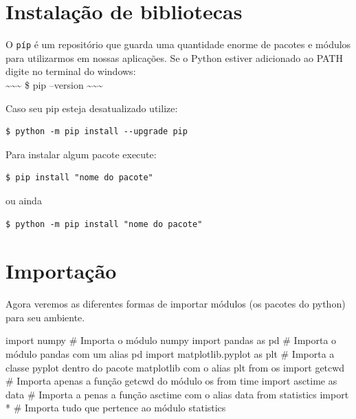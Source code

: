 \documentclass[
  letterpaper,
  DIV=11,
  numbers=noendperiod]{scrreprt}
\newenvironment{Shaded}{\begin{snugshade}}{\end{snugshade}}
\newcommand{\CommentTok}[1]{\textcolor[rgb]{0.37,0.37,0.37}{#1}}
\newcommand{\ImportTok}[1]{\textcolor[rgb]{0.00,0.46,0.62}{#1}}
\newcommand{\NormalTok}[1]{\textcolor[rgb]{0.00,0.23,0.31}{#1}}
\newcommand{\OperatorTok}[1]{\textcolor[rgb]{0.37,0.37,0.37}{#1}}
\begin{document}

\hypertarget{instalauxe7uxe3o-de-bibliotecas}{%
\chapter{Instalação de
bibliotecas}\label{instalauxe7uxe3o-de-bibliotecas}}

O \texttt{píp} é um repositório que guarda uma quantidade enorme de
pacotes e módulos para utilizarmos em nossas aplicações. Se o Python
estiver adicionado ao PATH digite no terminal do windows:\\
\textasciitilde\textasciitilde\textasciitilde{} \$ pip --version
\textasciitilde\textasciitilde\textasciitilde{}

Caso seu pip esteja desatualizado utilize:

\begin{verbatim}
$ python -m pip install --upgrade pip
\end{verbatim}

Para instalar algum pacote execute:

\begin{verbatim}
$ pip install "nome do pacote"
\end{verbatim}

ou ainda

\begin{verbatim}
$ python -m pip install "nome do pacote"
\end{verbatim}


\hypertarget{importauxe7uxe3o}{%
\chapter{Importação}\label{importauxe7uxe3o}}

Agora veremos as diferentes formas de importar módulos (os pacotes do
python) para seu ambiente.

\begin{Shaded}
\begin{Highlighting}[]
\ImportTok{import}\NormalTok{ numpy                        }\CommentTok{\# Importa o módulo numpy}
\ImportTok{import}\NormalTok{ pandas }\ImportTok{as}\NormalTok{ pd                 }\CommentTok{\# Importa o módulo pandas com um alias pd}
\ImportTok{import}\NormalTok{ matplotlib.pyplot }\ImportTok{as}\NormalTok{ plt     }\CommentTok{\# Importa a classe pyplot dentro do pacote matplotlib com o alias plt}
\ImportTok{from}\NormalTok{ os }\ImportTok{import}\NormalTok{ getcwd               }\CommentTok{\# Importa apenas a função getcwd do módulo os}
\ImportTok{from}\NormalTok{ time }\ImportTok{import}\NormalTok{ asctime }\ImportTok{as}\NormalTok{ data    }\CommentTok{\# Importa a penas a função asctime com o alias data }
\ImportTok{from}\NormalTok{ statistics }\ImportTok{import} \OperatorTok{*}            \CommentTok{\# Importa tudo que pertence ao módulo statistics}
\end{Highlighting}
\end{Shaded}
\end{document}
